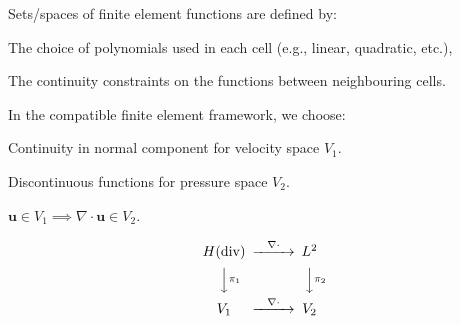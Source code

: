 \documentclass[landscape]{imposter}
\def\MM#1{\boldsymbol{#1}}
\newenvironment{packed_enum}{
\begin{enumerate}
  \setlength{\itemsep}{1pt}
  \setlength{\parskip}{0pt}
  \setlength{\parsep}{0pt}
}{\end{enumerate}}
\begin{document}
\begin{multicols*}{3}
Sets/spaces of finite element functions are defined by:
\begin{packed_enum}
\item The choice of polynomials used in each cell (e.g., linear,
  quadratic, etc.),
\item The continuity constraints on the functions between neighbouring
  cells.
\end{packed_enum}
In the compatible finite element framework, we choose:
\begin{packed_enum}
  \item Continuity in normal component for velocity space $V_1$.
  \item Discontinuous functions for pressure space $V_2$.
    \item $\MM{u}\in V_1 \implies
\nabla\cdot\MM{u}\in V_2$.
\end{packed_enum}
\vspace{-0.5cm}
\begin{equation*}
  \begin{CD}
H({\rm div})     @>\nabla\cdot >>  L^2 \\
@VV\pi_1V        @VV\pi_2 V\\
V_1     @>\nabla\cdot>>  V_2
\end{CD}
\end{equation*}
\vspace{-1cm}

\end{multicols*}
\end{document}
